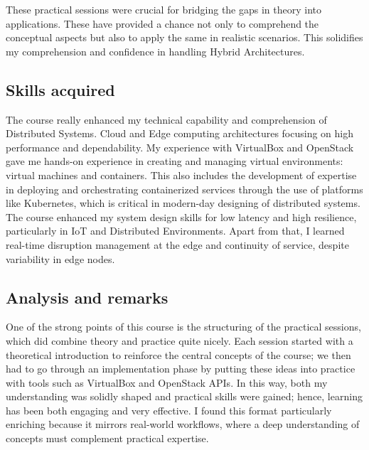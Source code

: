These practical sessions were crucial for bridging the gaps in theory into applications. These have provided a chance not only to comprehend the conceptual aspects but also to apply the same in realistic scenarios. This solidifies my comprehension and confidence in handling Hybrid Architectures.

\subsection{Skills acquired}
\indent \indent The course really enhanced my technical capability and comprehension of Distributed Systems. Cloud and Edge computing architectures focusing on high performance and dependability. My experience with VirtualBox and OpenStack gave me hands-on experience in creating and managing virtual environments: virtual machines and containers. This also includes the development of expertise in deploying and orchestrating containerized services through the use of platforms like Kubernetes, which is critical in modern-day designing of distributed systems. The course enhanced my system design skills for low latency and high resilience, particularly in IoT and Distributed Environments. Apart from that, I learned real-time disruption management at the edge and continuity of service, despite variability in edge nodes.

\subsection{Analysis and remarks}
\indent \indent One of the strong points of this course is the structuring of the practical sessions, which did combine theory and practice quite nicely. Each session started with a theoretical introduction to reinforce the central concepts of the course; we then had to go through an implementation phase by putting these ideas into practice with tools such as VirtualBox and OpenStack APIs. In this way, both my understanding was solidly shaped and practical skills were gained; hence, learning has been both engaging and very effective. I found this format particularly enriching because it mirrors real-world workflows, where a deep understanding of concepts must complement practical expertise.

